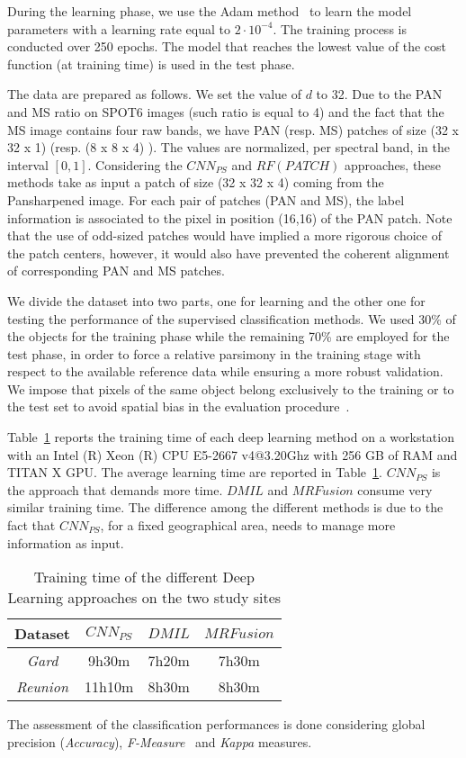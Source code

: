 \documentclass[journal]{IEEEtran}
\newcommand{\method}{$MRFusion$}
\begin{document}
During the learning phase, we use the Adam method~\cite{KingmaB14} to learn the model parameters with a learning rate equal to $2 \cdot 10^{-4}$. The training process is conducted over 250 epochs. The model that reaches the lowest value of the cost function (at training time) is used in the test phase.

The data are prepared as follows. We set the value of $d$ to 32. Due to the PAN and MS ratio on SPOT6 images (such ratio is equal to 4) and the fact that the MS image contains four raw bands, we have PAN (resp. MS) patches of size (32 x 32 x 1) (resp. (8 x 8 x 4) ). The values are normalized, per spectral band, in the interval $[0,1]$. Considering the $CNN_{PS}$ and $RF(PATCH)$ approaches, these methods take as input a patch of size (32 x 32 x 4) coming from the Pansharpened image. For each pair of patches (PAN and MS), the label information is associated to the pixel in position (16,16) of the PAN patch. Note that the use of odd-sized patches would have implied a more rigorous choice of the patch centers, however, it would also have prevented the coherent alignment of corresponding PAN and MS patches.

We divide the dataset into two parts, one for learning and the other one for testing the performance of the supervised classification methods. We used 30\% of the objects for the training phase while the remaining 70\% are employed for the test phase, in order to force a relative parsimony in the training stage with respect to the available reference data while ensuring a more robust validation. We impose that pixels of the same object belong exclusively to the training or to the test set to avoid spatial bias in the evaluation procedure~\cite{IngladaVATMR17}.

Table~\ref{tab:TrainingTime} reports the training time of each deep learning method on a workstation with an Intel (R) Xeon (R) CPU E5-2667 v4@3.20Ghz with 256 GB of RAM and TITAN X GPU. The average learning time are reported in Table~\ref{tab:TrainingTime}. $CNN_{PS}$ is the approach that demands more time. $DMIL$ and \method{} consume very similar training time. The difference among the different methods is due to the fact that $CNN_{PS}$, for a fixed geographical area, needs to manage more information as input.

\begin{table}[!ht]
\centering
\scriptsize
\begin{tabular}{cccc}
Dataset & $CNN_{PS}$ & $DMIL$ & \method{} \\ \hline \hline
\textit{Gard} & 9h30m & 7h20m & 7h30m \\ \hline
\textit{Reunion} & 11h10m & 8h30m & 8h30m \\ \hline
\end{tabular}
\caption{Training time of the different Deep Learning approaches on the two study sites \label{tab:TrainingTime}}
\end{table}The assessment of the classification performances is done considering global precision (\textit{Accuracy}), \textit{F-Measure}~\cite{IencoGDM17} and \textit{Kappa} measures.
\end{document}
